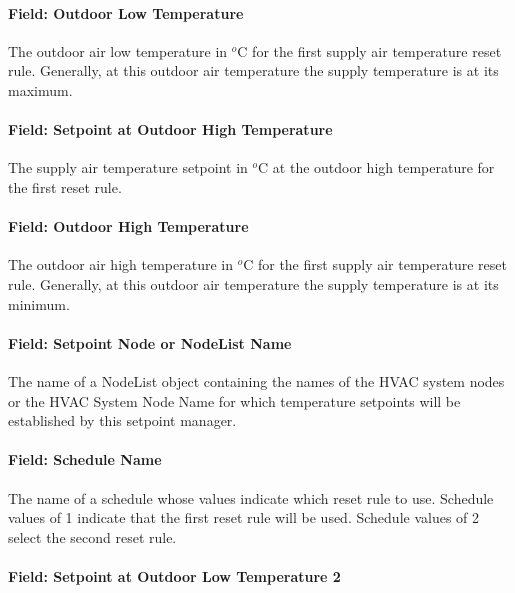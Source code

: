\paragraph{Field: Outdoor Low Temperature}\label{field-outdoor-low-temperature}

The outdoor air low temperature in \(^{o}\)C for the first supply air temperature reset rule. Generally, at this outdoor air temperature the supply temperature is at its maximum.

\paragraph{Field: Setpoint at Outdoor High Temperature}\label{field-setpoint-at-outdoor-high-temperature}

The supply air temperature setpoint in \(^{o}\)C at the outdoor high temperature for the first reset rule.

\paragraph{Field: Outdoor High Temperature}\label{field-outdoor-high-temperature}

The outdoor air high temperature in \(^{o}\)C for the first supply air temperature reset rule. Generally, at this outdoor air temperature the supply temperature is at its minimum.

\paragraph{Field: Setpoint Node or NodeList Name}\label{field-setpoint-node-or-nodelist-name-2}

The name of a NodeList object containing the names of the HVAC system nodes or the HVAC System Node Name for which temperature setpoints will be established by this setpoint manager.

\paragraph{Field: Schedule Name}\label{field-schedule-name-1-002}

The name of a schedule whose values indicate which reset rule to use. Schedule values of 1 indicate that the first reset rule will be used. Schedule values of 2 select the second reset rule.

\paragraph{Field: Setpoint at Outdoor Low Temperature 2}\label{field-setpoint-at-outdoor-low-temperature-2}

